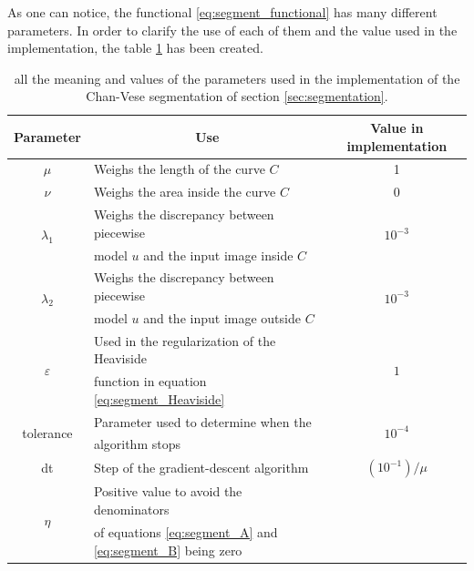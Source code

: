 \documentclass[10pt,a4paper]{llncs}
\begin{document}
As one can notice, the functional \ref{eq:segment_functional} has many different parameters. In order to clarify the use of each of them and the value used in the implementation, the table \ref{table:paremeters} has been created. 

\begin{table}
\begin{center}
\begin{tabular}{|c|l|c|}
\hline
Parameter & \multicolumn{1}{c|}{Use}  & \hspace{0.2cm}Value in implementation\hspace{0.2cm}\\
\hline
$\mu$ & \hspace{1pt} Weighs the length of the curve $C$&1\\
\hline
$\nu$ &\hspace{1pt} Weighs the area inside the curve $C$&0\\
\hline
\multirow{2}{1in}{\centering$\lambda_1$} & \hspace{0.1cm}Weighs the discrepancy between piecewise& \multirow{2}{1in}{\centering$10^{-3}$}\\
& \hspace{0.1cm}model $u$ and the input image inside $C$ &\\
\hline
\multirow{2}{1in}{\centering$\lambda_2$} & \hspace{0.1cm}Weighs the discrepancy between piecewise&\multirow{2}{1in}{\centering$10^{-3}$}\\
& \hspace{0.1cm}model $u$ and the input image outside $C$ &\\
\hline
\multirow{2}{1in}{\centering$\varepsilon$} & \hspace{0.1cm}Used in the regularization of the Heaviside&\multirow{2}{1in}{\centering$1$}\\
& \hspace{0.1cm}function in  equation \ref{eq:segment_Heaviside} &\\
\hline
\multirow{2}{1in}{\centering tolerance}
&\hspace{0.1cm}Parameter used to determine when the&\multirow{2}{1in}{\centering$10^{-4}$}\\
&\hspace{0.1cm}algorithm stops&\\
\hline
dt&\hspace{0.1cm}Step of the gradient-descent algorithm&$(10^{-1})/\mu$\\
\hline
\multirow{2}{1in}{\centering $\eta$}&\hspace{0.1cm}Positive value to avoid the denominators&\multirow{2}{1in}{\centering 1}\\
 &\hspace{0.1cm}of equations \ref{eq:segment_A} and \ref{eq:segment_B} being zero&\\
 \hline
\end{tabular}
\caption{all the meaning and values of the parameters used in the implementation of the Chan-Vese segmentation of section \ref{sec:segmentation}.}
\label{table:paremeters}
\end{center}
\end{table}
\end{document}
